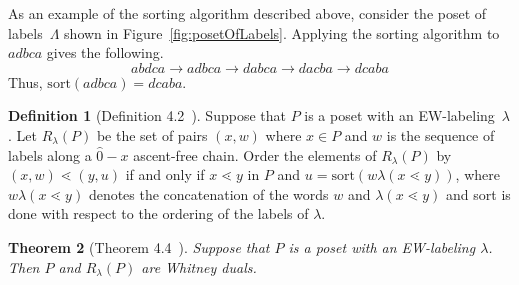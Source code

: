 \documentclass[11pt]{article}
\newtheorem{theo}{Theorem}[section]
\theoremstyle{definition}
\newtheorem{defi}[theo]{Definition}
\numberwithin{equation}{section}
\newcommand{\cover}{\lessdot}
\newcommand{\sort}{\mathrm{sort}}
\begin{document}
As an example of the sorting algorithm described above, consider the poset of labels~$\Lambda$ shown in Figure~\ref{fig:posetOfLabels}.  Applying the sorting algorithm to $adbca$ gives the following.
$$
abdca \rightarrow adbca \rightarrow dabca \rightarrow dacba \rightarrow dcaba
$$
Thus, $\sort(adbca) = dcaba$.

\begin{defi}[Definition 4.2~\cite{GonzalezHallam2021}]\label{definition:R_lambda}
Suppose that $P$ is a poset with an EW-labeling~$\lambda$.  Let $R_\lambda(P)$ be the set of pairs $(x,w)$ where $x \in P$ and $w$ is the sequence of labels along a $\hat{0}-x$ ascent-free  chain.  Order the elements of $R_\lambda(P)$ by $(x,w) \cover (y,u)$ if and only  if  $x\cover y$ in $P$ and $u =\sort(w\lambda(x\cover y))$, where $w\lambda(x\cover y)$ denotes the concatenation of the words $w$ and $\lambda(x\cover y)$ and sort is done with respect to the ordering of the labels of $\lambda$.   
\end{defi}

\begin{theo}[Theorem 4.4~\cite{GonzalezHallam2021}]\label{thm:WhitneyDualRLambda}
  Suppose that $P$ is a poset with an EW-labeling $\lambda$.  Then $P$ and $R_\lambda(P)$ are Whitney duals.
\end{theo}
\end{document}
